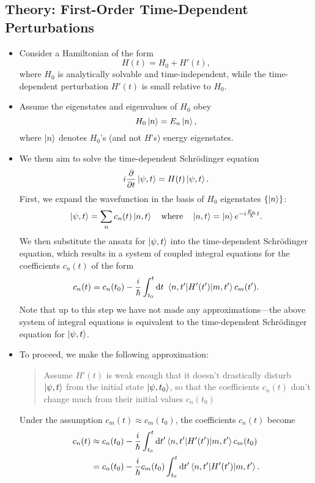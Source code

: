 \documentclass[11pt, a4paper]{article}
\newcommand{\diff}{\mathop{}\!\mathrm{d}} %
\newcommand{\Schro}{Schr\"{o}dinger\xspace}
\newcommand{\Ham}{Hamiltonian\xspace}
\newcommand{\p}{\psi}  %
\begin{document}
\subsection{Theory: First-Order Time-Dependent Perturbations}
\begin{itemize}
	\item Consider a \Ham of the form
	\begin{equation*}
		H(t) = H_{0} + H'(t),
	\end{equation*}
	where $ H_{0} $ is analytically solvable and time-independent, while the time-dependent perturbation $ H'(t) $ is small relative to $ H_{0} $.
	
	\item Assume the eigenstates and eigenvalues of $ H_{0} $ obey
	\begin{equation*}
		H_{0}\ket{n} = E_{n}\ket{n},
	\end{equation*}
	where $ \ket{n} $ denotes $ H_{0} $'s (and not $ H $'s) energy eigenstates.
	
	\item We them aim to solve the time-dependent \Schro equation
	\begin{equation*}
		i \pdv{t} \ket{\p, t} = H(t)\ket{\p, t}.
	\end{equation*}
	First, we expand the wavefunction in the basis of $ H_{0} $ eigenstates $ \{\ket{n}\} $:
	\begin{equation*}
		\ket{\p, t} = \sum_{n}c_{n}(t) \ket{n, t} \quad \text{where} \quad \ket{n, t} = \ket{n}e^{-i\frac{E_{n}}{\hbar}t}.
	\end{equation*}
	We then substitute the ansatz for $ \ket{\p, t} $ into the time-dependent \Schro equation, which results in a system of coupled integral equations for the coefficients $ c_{n}(t) $ of the form
	\begin{equation*}
		c_{n}(t) = c_{n}(t_{0}) - \frac{i}{\hbar}\int_{t_{0}}^{t}\diff t\ \mel{n, t'}{H'(t')}{m, t'}c_{m}(t').
	\end{equation*}
	Note that up to this step we have not made any approximations---the above system of integral equations is equivalent to the time-dependent \Schro equation for $ \ket{\p, t} $.
	
	\item To proceed, we make the following approximation:
	
	\begin{quote}
		Assume $ H'(t) $ is weak enough that it doesn't drastically disturb $ \ket{\p, t} $ from the initial state $ \ket{\p, t_{0}} $, so that the coefficients $ c_{n}(t) $ don't change much from their initial values $ c_{n}(t_{0}) $
	\end{quote}
	Under the assumption $ c_{m}(t) \approx c_{m}(t_{0}) $, the coefficients $ c_{n}(t) $ become
	\begin{align*}
		c_{n}(t) & \approx c_{n}(t_{0}) - \frac{i}{\hbar}\int_{t_{0}}^{t}\diff t' \mel{n, t'}{H'(t')}{m, t'}c_{m}(t_{0})\\
		& = c_{n}(t_{0}) - \frac{i}{\hbar}c_{m}(t_{0})\int_{t_{0}}^{t}\diff t'  \mel{n, t'}{H'(t')}{m, t'}.
	\end{align*}
	

\end{itemize}
\end{document}
